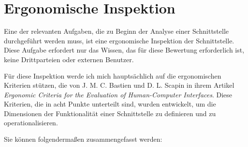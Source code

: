 \section{Ergonomische Inspektion}

Eine der relevanten Aufgaben, die zu Beginn der Analyse einer Schnittstelle durchgeführt werden muss, ist eine ergonomische Inspektion der Schnittstelle.
Diese Aufgabe erfordert nur das Wissen, das für diese Bewertung erforderlich ist, keine Drittparteien oder externen Benutzer.

Für diese Inspektion werde ich mich hauptsächlich auf die ergonomischen Kriterien stützen, die von J. M. C. Bastien und D. L. Scapin in ihrem Artikel \textit{Ergonomic Criteria for the Evaluation of Human-Computer Interfaces}\cite{bastienscapin}.
Diese Kriterien, die in acht Punkte unterteilt sind, wurden entwickelt, um die Dimensionen der Funktionalität einer Schnittstelle zu definieren und zu operationalisieren.

Sie können folgendermaßen zusammengefasst werden:

